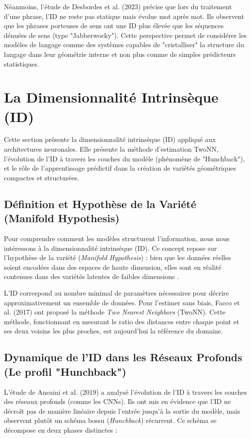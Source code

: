 Néanmoins, l’étude de Desbordes et al. (2023) précise que lors du traitement d’une phrase, l’ID ne reste pas statique mais évolue mot après mot. Ils observent que les phrases porteuses de sens ont une ID plus élevée que les séquences dénuées de sens (type "Jabberwocky"). Cette perspective permet de considérer les modèles de langage comme des systèmes capables de "cristalliser" la structure du langage dans leur géométrie interne et non plus comme de simples prédicteurs statistiques.

\section{La Dimensionnalité Intrinsèque (ID)}
Cette section présente la dimensionnalité intrinsèque (ID) appliqué aux architectures neuronales. Elle présente la méthode d'estimation TwoNN, l'évolution de l'ID à travers les couches du modèle (phénomène de "Hunchback"), et le rôle de l'apprentissage prédictif dans la création de variétés géométriques compactes et structurées. 

\subsection{Définition et Hypothèse de la Variété (Manifold Hypothesis)}
Pour comprendre comment les modèles structurent l'information, nous nous intéressons à la dimensionnalité intrinsèque (ID). Ce concept repose sur l'hypothèse de la variété (\textit{Manifold Hypothesis}) : bien que les données réelles soient encodées dans des espaces de haute dimension, elles sont en réalité contenues dans des variétés latentes de faibles dimensions \cite{facco2017estimating}.

L’ID correspond au nombre minimal de paramètres nécessaires pour décrire approximativement un ensemble de données. Pour l'estimer sans biais, Facco et al. (2017) ont proposé la méthode \textit{Two Nearest Neighbors} (TwoNN). Cette méthode, fonctionnant en mesurant le ratio des distances entre chaque point et ses deux voisins les plus proches, est aujourd’hui la référence du domaine.

\subsection{Dynamique de l'ID dans les Réseaux Profonds (Le profil "Hunchback")}
L’étude de Ansuini et al. (2019) \cite{ansuini2019intrinsic} a analysé l’évolution de l’ID à travers les couches des réseaux profonds (comme les CNNs). Ils ont mis en évidence que l’ID ne décroît pas de manière linéaire depuis l'entrée jusqu'à la sortie du modèle, mais observent plutôt un schéma \og bossu \fg{} (\textit{Hunchback}) récurrent. Ce schéma se décompose en deux phases distinctes :

